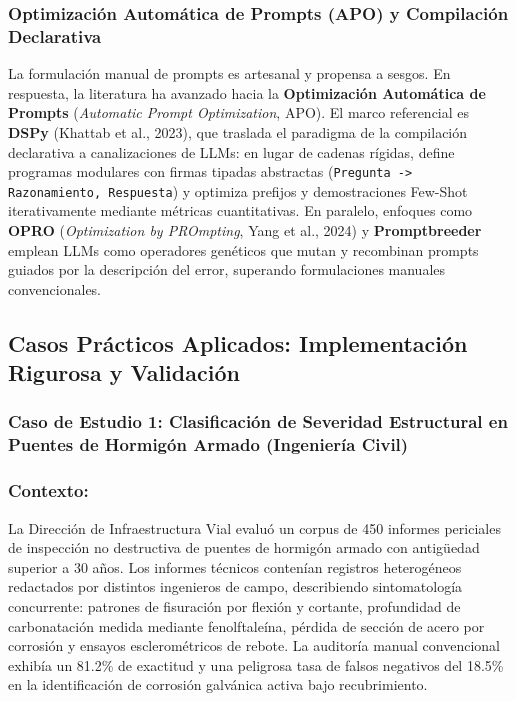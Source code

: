 \subsubsection{Optimización Automática de Prompts (APO) y Compilación Declarativa}

La formulación manual de prompts es artesanal y propensa a sesgos. En respuesta, la literatura ha avanzado hacia la \textbf{Optimización Automática de Prompts} (\textit{Automatic Prompt Optimization}, APO). El marco referencial es \textbf{DSPy} (Khattab et al., 2023), que traslada el paradigma de la compilación declarativa a canalizaciones de LLMs: en lugar de cadenas rígidas, define programas modulares con firmas tipadas abstractas (\texttt{Pregunta -> Razonamiento, Respuesta}) y optimiza prefijos y demostraciones Few-Shot iterativamente mediante métricas cuantitativas. En paralelo, enfoques como \textbf{OPRO} (\textit{Optimization by PROmpting}, Yang et al., 2024) y \textbf{Promptbreeder} emplean LLMs como operadores genéticos que mutan y recombinan prompts guiados por la descripción del error, superando formulaciones manuales convencionales.

\newpage
\subsection{Casos Prácticos Aplicados: Implementación Rigurosa y Validación}

\subsubsection{Caso de Estudio 1: Clasificación de Severidad Estructural en Puentes de Hormigón Armado (Ingeniería Civil)}

\subsubsection*{Contexto:}
La Dirección de Infraestructura Vial evaluó un corpus de 450 informes periciales de inspección no destructiva de puentes de hormigón armado con antigüedad superior a 30 años. Los informes técnicos contenían registros heterogéneos redactados por distintos ingenieros de campo, describiendo sintomatología concurrente: patrones de fisuración por flexión y cortante, profundidad de carbonatación medida mediante fenolftaleína, pérdida de sección de acero por corrosión y ensayos esclerométricos de rebote. La auditoría manual convencional exhibía un 81.2\% de exactitud y una peligrosa tasa de falsos negativos del 18.5\% en la identificación de corrosión galvánica activa bajo recubrimiento.

